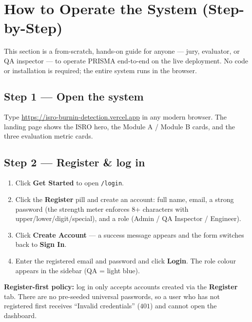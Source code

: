 \documentclass[11pt,a4paper]{article}
\newcommand{\code}[1]{\texttt{\small #1}}
\newcommand{\keys}[1]{\textbf{\sffamily#1}}
\begin{document}
\section{How to Operate the System (Step-by-Step)}

\noindent This section is a from-scratch, hands-on guide for anyone --- jury, evaluator, or QA
inspector --- to operate PRISMA end-to-end on the live deployment. No code or installation is
required; the entire system runs in the browser.

\subsection*{Step 1 --- Open the system}
Type \url{https://isro-burnin-detection.vercel.app} in any modern browser. The landing page shows
the ISRO hero, the Module A / Module B cards, and the three evaluation metric cards.

\subsection*{Step 2 --- Register \& log in}
\begin{enumerate}[leftmargin=1.5em]
  \item Click \keys{Get Started} to open \code{/login}.
  \item Click the \keys{Register} pill and create an account: full name, email, a strong
        password (the strength meter enforces 8+ characters with upper/lower/digit/special),
        and a role (Admin / QA Inspector / Engineer).
  \item Click \keys{Create Account} --- a success message appears and the form switches back to
        \keys{Sign In}.
  \item Enter the registered email and password and click \keys{Login}. The role colour appears
        in the sidebar (QA = light blue).
\end{enumerate}
\textbf{Register-first policy:} log in only accepts accounts created via the \keys{Register} tab.
There are no pre-seeded universal passwords, so a user who has not registered first receives
``Invalid credentials'' ($401$) and cannot open the dashboard.
\end{document}
